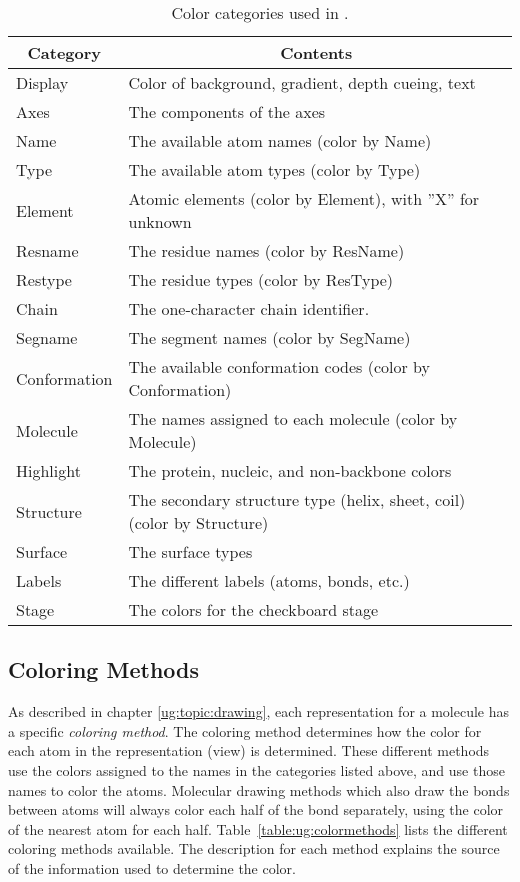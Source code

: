 \begin{table}[htb]
  \hspace{0.4in}
  \begin{tabular}{|l|l|} \hline
    \multicolumn{1}{|c}{Category} &
        \multicolumn{1}{|c|}{Contents} \\ \hline\hline
    Display	& Color of background, gradient, depth cueing, text \\
    Axes	& The components of the axes \\
    Name	& The available atom names (color by Name) \\
    Type	& The available atom types (color by Type) \\
    Element     & Atomic elements  (color by Element), with ''X'' for unknown \\
    Resname	& The residue names (color by ResName) \\
    Restype	& The residue types (color by ResType) \\
    Chain	& The one-character chain identifier. \\
    Segname	& The segment names (color by SegName)  \\
    Conformation & The available conformation codes (color by Conformation) \\
    Molecule	& The names assigned to each molecule (color by Molecule) \\
    Highlight	& The protein, nucleic, and non-backbone colors \\
    Structure   & The secondary structure type (helix, sheet, coil) (color by Structure) \\
    Surface     & The surface types \\
    Labels	& The different labels (atoms, bonds, etc.) \\
    Stage	& The colors for the checkboard stage \\
    \hline
  \end{tabular}
  \caption{Color categories used in \VMD.}
  \label{table:ug:colorcats}
\end{table}


\subsection{Coloring Methods}
\label{ug:topic:coloring:methods}

As described in chapter \ref{ug:topic:drawing}, each representation
for a molecule has a specific {\em coloring method}.  The coloring
method determines how the color for each atom in the representation
(view) is determined.  These different methods use the colors assigned
to the names in the categories listed above, and use those names to
color the atoms.  Molecular drawing methods which also draw the bonds
between atoms will always color each half of the bond separately,
using the color of the nearest atom for each half.  
Table~\ref{table:ug:colormethods} lists the different coloring methods
available.  The description for each method explains the source of
the information used to determine the color.

